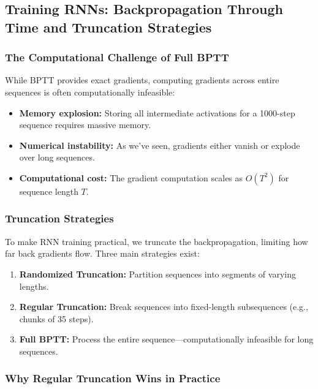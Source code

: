 \documentclass{article}
\begin{document}
\subsection{Training RNNs: Backpropagation Through Time and Truncation Strategies}

\subsubsection{The Computational Challenge of Full BPTT}

While BPTT provides exact gradients, computing gradients across entire sequences is often computationally infeasible:

\begin{itemize}
\item \textbf{Memory explosion:} Storing all intermediate activations for a 1000-step sequence requires massive memory.
\item \textbf{Numerical instability:} As we've seen, gradients either vanish or explode over long sequences.
\item \textbf{Computational cost:} The gradient computation scales as $O(T^2)$ for sequence length $T$.
\end{itemize}

\subsubsection{Truncation Strategies}

To make RNN training practical, we truncate the backpropagation, limiting how far back gradients flow. Three main strategies exist:



\begin{enumerate}
\item \textbf{Randomized Truncation:} Partition sequences into segments of varying lengths.
\item \textbf{Regular Truncation:} Break sequences into fixed-length subsequences (e.g., chunks of 35 steps).
\item \textbf{Full BPTT:} Process the entire sequence—computationally infeasible for long sequences.
\end{enumerate}

\subsubsection{Why Regular Truncation Wins in Practice}
\end{document}
